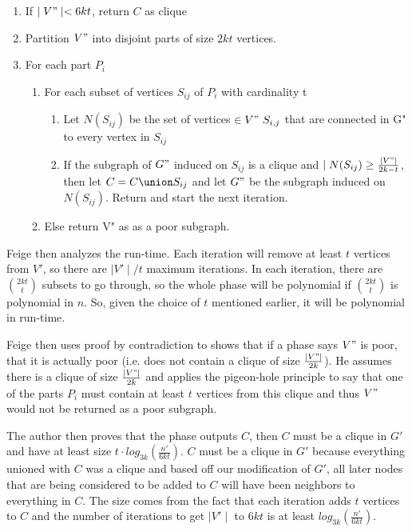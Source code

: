 \documentclass{article}
\theoremstyle{definition}
\begin{document}
\begin{enumerate}
\item{If $\mid V"\mid  < 6kt$, return $C$ as clique}
\item{Partition $V"$ into disjoint parts of size $2kt$ vertices.}
\item{For each part $P_i$}
	\begin{enumerate}
		\item{For each subset of vertices $S_{ij}$ of $P_i$ with cardinality t}
			\begin{enumerate}
				\item{Let $N(S_{ij})$ be the set of vertices $\in V" \ S_{i,j}$ that are connected in G" to every vertex in $S_{ij}$}
				\item{If the subgraph of $G"$ induced on $S_{ij}$ is a clique and $\mid N(S_{ij}) \geq \frac{\mid V"\mid }{2k - t}$, then let $C = C \union S_{ij}$ and let $G"$ be the subgraph induced on $N(S_{ij})$. Return and start the next iteration.} 
			\end{enumerate}
			\item{Else return V" as as a poor subgraph.}
	\end{enumerate}
\end{enumerate}
Feige then analyzes the run-time. Each iteration will remove at least $t$ vertices from $V'$, so there are $\mid V'\mid /t$ maximum iterations. In each iteration, there are $\binom{2kt}{t}$ subsets to go through, so the whole phase will be polynomial if $\binom{2kt}{t}$ is polynomial in $n$. So, given the choice of $t$ mentioned earlier, it will be polynomial in run-time. 

Feige then uses proof by contradiction to shows that if a phase says $V"$ is poor, that it is actually poor (i.e. does not contain a clique of size $\frac{\mid V"\mid }{2k}$). He assumes there is a clique of size $\frac{\mid V"\mid }{2k}$ and applies the pigeon-hole principle to say that one of the parts $P_i$ must contain at least $t$ vertices from this clique and thus $V"$ would not be returned as a poor subgraph.  

The author then proves that the phase outputs $C$, then $C$ must be a clique in $G'$ and have at least size $t \cdot log_{3k}(\frac{n'}{6kt})$. $C$ must be a clique in $G'$ because everything unioned with $C$ was a clique and based off our modification of $G'$, all later nodes that are being considered to be added to $C$ will have been neighbors to everything in $C$. The size comes from the fact that each iteration adds $t$ vertices to $C$ and the number of iterations to get $\mid V'\mid $ to $6kt$ is at least $log_{3k}(\frac{n'}{6kt})$.
\end{document}

